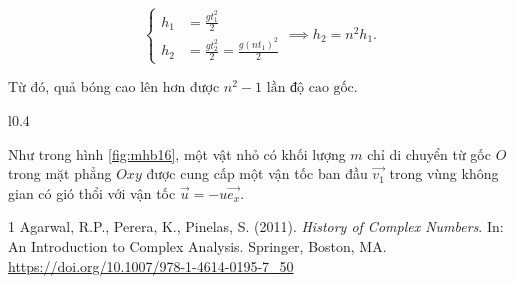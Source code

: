 \documentclass[a4paper, titlepage, openany]{book}
\newcounter{exercise}
\begin{document}
\begin{equation*}
   \begin{cases}
      h_1 &= \frac{gt_1^2}{2} \\
      h_2 &= \frac{gt_2^2}{2} = \frac{g\left(nt_1\right)^2}{2}
   \end{cases}
   \implies h_2 = n^2 h_1.
\end{equation*}

Từ đó, quả bóng cao lên hơn được $\boxed{n^2 - 1 \text{ lần độ cao gốc}}$.

\begin{wrapfigure}{l}{0.4\textwidth} %
   \centering

   \caption{Hình minh họa cho bài \ref{ex:16}}
   \label{fig:mhb16}
\end{wrapfigure}

\exercise[ex:16] Như trong hình \ref{fig:mhb16}, một vật nhỏ có khối lượng $m$ chỉ di chuyển từ gốc $O$ trong mặt phẳng $Oxy$ được cung cấp một vận tốc ban đầu $\overrightarrow{v_1}$ trong vùng không gian có gió thổi với vận tốc $\vec{u} = -u \overrightarrow{e_x}$.



\begin{thebibliography}{1}
Agarwal, R.P., Perera, K., Pinelas, S. (2011). \textit{History of Complex Numbers}. In: An Introduction to Complex Analysis. Springer, Boston, MA. \url{https://doi.org/10.1007/978-1-4614-0195-7_50}
\end{thebibliography}
\end{document}
